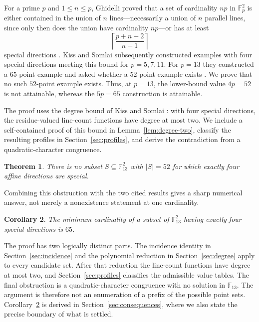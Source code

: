 \documentclass[11pt]{amsart}
\newtheorem{theorem}{Theorem}[section]
\newtheorem{corollary}[theorem]{Corollary}
\theoremstyle{remark}
\newcommand{\F}{\mathbb F}
\begin{document}
For a prime $p$ and $1\le n\le p$, Ghidelli proved that a set of cardinality
$np$ in $\F_p^2$ is either
contained in the union of $n$ lines---necessarily a union of $n$ parallel
lines, since only then does the union have cardinality $np$---or has at least
\begin{equation}\label{eq:ghidelli-bound}
  \left\lceil\frac{p+n+2}{n+1}\right\rceil
\end{equation}
special directions \cite[Theorem~1.3]{GhidelliRichPoor}.  Kiss and Somlai
subsequently constructed examples with four special directions meeting this
bound for $p=5,7,11$.  For $p=13$ they constructed a $65$-point example and
asked whether a $52$-point example exists
\cite[Section~6]{KissSomlaiSpecialDirections}.  We prove that no such
$52$-point example exists.  Thus, at $p=13$, the lower-bound value $4p=52$ is not
attainable, whereas the $5p=65$ construction is attainable.

The proof uses the degree bound of Kiss and Somlai
\cite[Proposition~3.1]{KissSomlaiSpecialDirections}: with four special
directions, the residue-valued line-count functions have degree at most two.
We include a self-contained proof of this bound in
Lemma~\ref{lem:degree-two}, classify the resulting profiles in
Section~\ref{sec:profiles}, and derive the contradiction from a
quadratic-character congruence.

\begin{theorem}\label{thm:main}
There is no subset $S\subseteq\F_{13}^{2}$ with $|S|=52$ for which exactly
four affine directions are special.
\end{theorem}

Combining this obstruction with the two cited results gives a sharp numerical
answer, not merely a nonexistence statement at one cardinality.

\begin{corollary}\label{cor:minimum}
The minimum cardinality of a subset of $\F_{13}^{2}$ having exactly four
special directions is $65$.
\end{corollary}

The proof has two logically distinct parts.  The incidence identity in
Section~\ref{sec:incidence} and the polynomial reduction in
Section~\ref{sec:degree} apply to every candidate set.  After that reduction
the line-count functions have degree at most two, and
Section~\ref{sec:profiles} classifies the admissible value tables.  The final
obstruction is a quadratic-character congruence with no solution in
$\F_{13}$.  The argument is therefore not an enumeration of a prefix of the
possible point sets.  Corollary~\ref{cor:minimum} is derived in
Section~\ref{sec:consequences}, where we also state the precise boundary of
what is settled.
\end{document}
